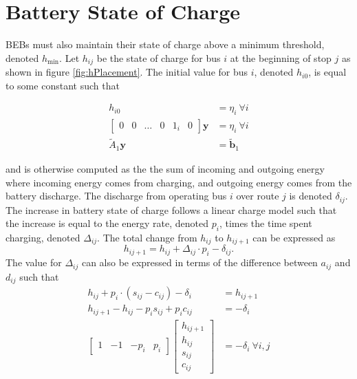 \section{Battery State of Charge\label{sec:5_battery}}
BEBs must also maintain their state of charge above a minimum threshold, denoted $h_{\text{min}}$. Let $h_{ij}$ be the state of charge for bus $i$ at the beginning of stop $j$ as shown in figure \ref{fig:hPlacement}. The initial value for bus $i$, denoted $h_{i0}$, is equal to some constant such that

\begin{equation}\label{eqn:initialSoc0}\begin{aligned}
	h_{i0} &= \eta_{i} \ \forall i \\
	\begin{bmatrix}0 & 0 & \hdots & 0 & 1_i& 0 \end{bmatrix}\mathbf{y} &= \eta_i \ \forall i \\
		\tilde{A}_1\mathbf{y} &= \tilde{\mathbf{b}}_1
\end{aligned} \end{equation}

\par and is otherwise computed as the the sum of incoming and outgoing energy where incoming energy comes from charging, and outgoing energy comes from the battery discharge. The discharge from operating bus $i$ over route $j$ is denoted $\delta_{ij}$. The increase in battery state of charge follows a linear charge model such that the increase is equal to the energy rate, denoted $p_i$, times the time spent charging, denoted $\Delta_{ij}$\cite{rong_coordinated_2016}.
The total change from $h_{ij}$ to $h_{ij+1}$ can be expressed as
\begin{equation}
	h_{ij+1} = h_{ij} + \Delta_{ij} \cdot p_i - \delta_{ij}.
\end{equation}
The value for $\Delta_{ij}$ can also be expressed in terms of the difference between $a_{ij}$ and $d_{ij}$ such that
\begin{equation}\label{eqn:socDynamic1}\begin{aligned}
	h_{ij} + p_i\cdot \left ( s_{ij} - c_{ij} \right ) - \delta_i &= h_{ij+1}\\
	h_{ij+1} - h_{ij} - p_is_{ij} + p_ic_{ij} &= -\delta_i\\
	\begin{bmatrix} 1 & -1 & -p_i & p_i\end{bmatrix} \begin{bmatrix}h_{ij+1} \\ h_{ij} \\ s_{ij} \\ c_{ij} \end{bmatrix} &= -\delta_i \ \forall i,j
\end{aligned}\end{equation}
